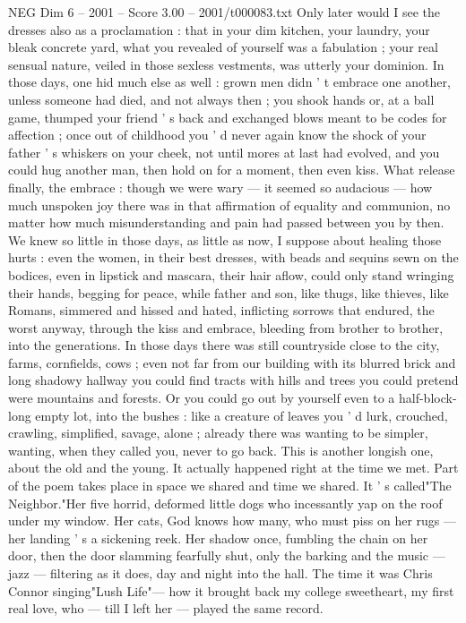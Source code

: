 \begin{textsample}{NEG Dim 6 – 2001 – Score 3.00 – 2001/t000083.txt}
Only later would I see the dresses also as a proclamation : that in your dim kitchen, your laundry, your bleak concrete yard, what you revealed of yourself was a fabulation ; your real sensual nature, veiled in those sexless vestments, was utterly your dominion.
In those days, one hid much else as well : grown men didn ' t embrace one another, unless someone had died, and not always then ; you shook hands or, at a ball game, thumped your friend ' s back and exchanged blows meant to be codes for affection ; once out of childhood you ' d never again know the shock of your father ' s whiskers on your cheek, not until mores at last had evolved, and you could hug another man, then hold on for a moment, then even kiss.
What release finally, the embrace : though we were wary — it seemed so audacious — how much unspoken joy there was in that affirmation of equality and communion, no matter how much misunderstanding and pain had passed between you by then.
We knew so little in those days, as little as now, I suppose about healing those hurts : even the women, in their best dresses, with beads and sequins sewn on the bodices, even in lipstick and mascara, their hair aflow, could only stand wringing their hands, begging for peace, while father and son, like thugs, like thieves, like Romans, simmered and hissed and hated, inflicting sorrows that endured, the worst anyway, through the kiss and embrace, bleeding from brother to brother, into the generations.
In those days there was still countryside close to the city, farms, cornfields, cows ; even not far from our building with its blurred brick and long shadowy hallway you could find tracts with hills and trees you could pretend were mountains and forests.
Or you could go out by yourself even to a half-block-long empty lot, into the bushes : like a creature of leaves you ' d lurk, crouched, crawling, simplified, savage, alone ; already there was wanting to be simpler, wanting, when they called you, never to go back.
This is another longish one, about the old and the young.
It actually happened right at the time we met.
Part of the poem takes place in space we shared and time we shared.
It ' s called"The Neighbor."Her five horrid, deformed little dogs who incessantly yap on the roof under my window.
Her cats, God knows how many, who must piss on her rugs — her landing ' s a sickening reek.
Her shadow once, fumbling the chain on her door, then the door slamming fearfully shut, only the barking and the music — jazz — filtering as it does, day and night into the hall.
The time it was Chris Connor singing"Lush Life"— how it brought back my college sweetheart, my first real love, who — till I left her — played the same record.

\end{textsample}
